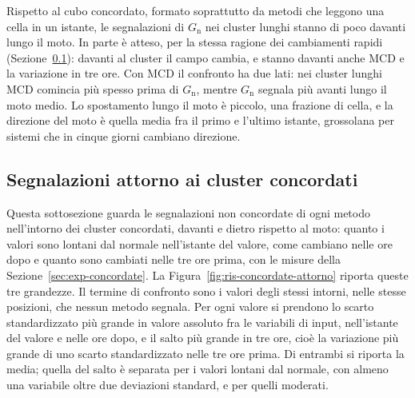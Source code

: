 Rispetto al cubo concordato, formato soprattutto da metodi che leggono una cella in un istante, le segnalazioni di $G_{\mathrm{n}}$ nei cluster lunghi stanno di poco davanti lungo il moto. In parte è atteso, per la stessa ragione dei cambiamenti rapidi (Sezione~\ref{sec:ris-concordate-attorno}): davanti al cluster il campo cambia, e stanno davanti anche MCD e la variazione in tre ore. Con MCD il confronto ha due lati: nei cluster lunghi MCD comincia più spesso prima di $G_{\mathrm{n}}$, mentre $G_{\mathrm{n}}$ segnala più avanti lungo il moto medio. Lo spostamento lungo il moto è piccolo, una frazione di cella, e la direzione del moto è quella media fra il primo e l'ultimo istante, grossolana per sistemi che in cinque giorni cambiano direzione.

\subsection{Segnalazioni attorno ai cluster concordati}
\label{sec:ris-concordate-attorno}

Questa sottosezione guarda le segnalazioni non concordate di ogni metodo nell'intorno dei cluster concordati, davanti e dietro rispetto al moto: quanto i valori sono lontani dal normale nell'istante del valore, come cambiano nelle ore dopo e quanto sono cambiati nelle tre ore prima, con le misure della Sezione~\ref{sec:exp-concordate}. La Figura~\ref{fig:ris-concordate-attorno} riporta queste tre grandezze. Il termine di confronto sono i valori degli stessi intorni, nelle stesse posizioni, che nessun metodo segnala. Per ogni valore si prendono lo scarto standardizzato più grande in valore assoluto fra le variabili di input, nell'istante del valore e nelle ore dopo, e il salto più grande in tre ore, cioè la variazione più grande di uno scarto standardizzato nelle tre ore prima. Di entrambi si riporta la media; quella del salto è separata per i valori lontani dal normale, con almeno una variabile oltre due deviazioni standard, e per quelli moderati.

